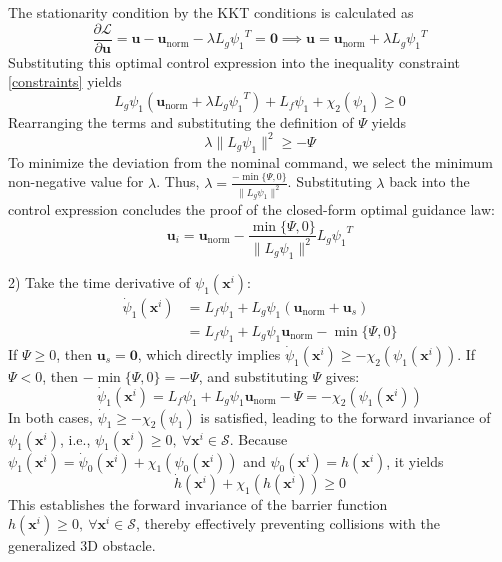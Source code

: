 \documentclass[lettersize,journal]{IEEEtran}
\begin{document}
The stationarity condition by the KKT conditions is calculated as
\begin{equation}
	\frac{\partial \mathcal{L}}{\partial {\mathbf{u}}} = {\mathbf{u}} - \mathbf{u}_{\mathrm{norm}} - \lambda L_{{g}}{\psi _1}^T = \mathbf{0} \implies {\mathbf{u}} = \mathbf{u}_{\mathrm{norm}} + \lambda L_{{g}}{\psi _1}^T
\end{equation}
Substituting this optimal control expression into the inequality constraint \eqref{constraints} yields
\begin{equation}
	L_{{g}}{\psi _1} \left(\mathbf{u}_{\mathrm{norm}} + \lambda L_{{g}}{\psi _1}^T\right) + L_{{f}}{\psi _1} + {\chi _2}({\psi _1}) \ge 0
\end{equation}
Rearranging the terms and substituting the definition of $\Psi$ yields
\begin{equation}
	\lambda \|L_{{g}}{\psi _1}\|^2 \ge -\Psi
\end{equation}
To minimize the deviation from the nominal command, we select the minimum non-negative value for $\lambda$. Thus, $\lambda = \frac{-\min\{\Psi, 0\}}{\|L_{{g}}{\psi _1}\|^2}$. Substituting $\lambda$ back into the control expression concludes the proof of the closed-form optimal guidance law:
\begin{equation}
	\mathbf{u}_i = \mathbf{u}_{\mathrm{norm}} - \frac{\min\{\Psi, 0\}}{\|L_{{g}}{\psi _1}\|^2} L_{{g}}{\psi _1}^T
\end{equation}

2) Take the time derivative of $\psi_1(\mathbf{x}^i)$:
\begin{equation}
	\begin{split}
		\dot{\psi}_1(\mathbf{x}^i) & = L_{{f}}{\psi _1} + L_{{g}}{\psi _1}(\mathbf{u}_{\mathrm{norm}} + \mathbf{u}_s) \\
		& = L_{{f}}{\psi _1} + L_{{g}}{\psi _1}\mathbf{u}_{\mathrm{norm}} - \min\{\Psi, 0\}
	\end{split}
\end{equation}
If $\Psi \ge 0$, then $\mathbf{u}_s = \mathbf{0}$, which directly implies $\dot{\psi}_1(\mathbf{x}^i) \ge -{\chi _2}({\psi _1}(\mathbf{x}^i))$. 
If $\Psi < 0$, then $-\min\{\Psi, 0\} = -\Psi$, and substituting $\Psi$ gives:
\begin{equation}
	\dot{\psi}_1(\mathbf{x}^i) = L_{{f}}{\psi _1} + L_{{g}}{\psi _1}\mathbf{u}_{\mathrm{norm}} - \Psi  = -{\chi _2}({\psi _1}(\mathbf{x}^i))
\end{equation}
In both cases, $\dot{\psi}_1 \ge -{\chi _2}({\psi _1})$ is satisfied, leading to the forward invariance of $\psi_1(\mathbf{x}^i)$, i.e., ${\psi _1}(\mathbf{x}^i) \ge 0, \ \forall \mathbf{x}^i \in \mathcal{S}$. Because ${\psi _1}(\mathbf{x}^i) = {\dot{\psi} _0}(\mathbf{x}^i) + {\chi _1}({\psi _0}(\mathbf{x}^i))$ and $\psi_0(\mathbf{x}^i) = h(\mathbf{x}^i)$, it yields
\begin{equation}
	\dot{h}(\mathbf{x}^i) + {\chi _1}(h(\mathbf{x}^i)) \ge 0
\end{equation}
This establishes the forward invariance of the barrier function $h(\mathbf{x}^i) \ge 0, \ \forall \mathbf{x}^i \in \mathcal{S}$, thereby effectively preventing collisions with the generalized 3D obstacle.
\end{document}
